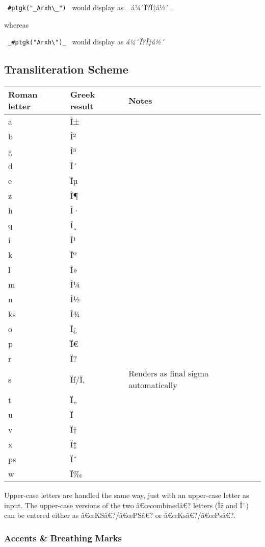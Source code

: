 \texttt{\ \#ptgk("\_Arxh\textbackslash{}\_")\ } would display as
\_á¼ˆÏ?Ï‡á½´\_

whereas

\texttt{\ \_\#ptgk("Arxh\textbackslash{}")\_\ } would display as
\emph{á¼ˆÏ?Ï‡á½´}

\subsection{Transliteration Scheme}\label{transliteration-scheme}

\begin{longtable}[]{@{}lll@{}}
\toprule\noalign{}
Roman letter & Greek result & Notes \\
\midrule\noalign{}
\endhead
\bottomrule\noalign{}
\endlastfoot
a & Î± & \\
b & Î² & \\
g & Î³ & \\
d & Î´ & \\
e & Îµ & \\
z & Î¶ & \\
h & Î· & \\
q & Î¸ & \\
i & Î¹ & \\
k & Îº & \\
l & Î» & \\
m & Î¼ & \\
n & Î½ & \\
ks & Î¾ & \\
o & Î¿ & \\
p & Ï€ & \\
r & Ï? & \\
s & Ïƒ/Ï‚ & Renders as final sigma automatically \\
t & Ï„ & \\
u & Ï & \\
v & Ï† & \\
x & Ï‡ & \\
ps & Ïˆ & \\
w & Ï‰ & \\
\end{longtable}

Upper-case letters are handled the same way, just with an upper-case
letter as input. The upper-case versions of the two â€œcombinedâ€?
letters (Îž and Î¨) can be entered either as â€œKSâ€?/â€œPSâ€? or
â€œKsâ€?/â€œPsâ€?.

\subsubsection{Accents \& Breathing
Marks}\label{accents-breathing-marks}

